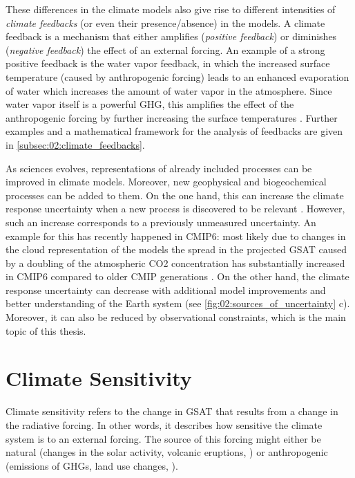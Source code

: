 These differences in the climate models also give rise to different intensities
of \emph{climate feedbacks} (or even their presence/absence) in the models. A
climate feedback is a mechanism that either amplifies (\emph{positive
  feedback}) or diminishes (\emph{negative feedback}) the effect of an external
forcing. An example of a strong positive feedback is the water vapor feedback,
in which the increased surface temperature (caused by anthropogenic forcing)
leads to an enhanced evaporation of water which increases the amount of water
vapor in the atmosphere. Since water vapor itself is a powerful \ac{GHG}, this
amplifies the effect of the anthropogenic forcing by further increasing the
surface temperatures \autocite{Cubasch2013}. Further examples and a
mathematical framework for the analysis of feedbacks are given in
\cref{subsec:02:climate_feedbacks}.

As sciences evolves, representations of already included processes can be
improved in climate models. Moreover, new geophysical and biogeochemical
processes can be added to them. On the one hand, this can increase the climate
response uncertainty when a new process is discovered to be relevant
. However, such an
increase corresponds to a previously unmeasured uncertainty. An example for
this has recently happened in \acs{CMIP}6: most likely due to changes in the
cloud representation of the models the spread in the projected \ac{GSAT} caused
by a doubling of the atmospheric \ac{CO2} concentration has substantially
increased in \acs{CMIP}6 compared to older \ac{CMIP} generations
\autocite{Zelinka2020}. On the other hand, the climate response uncertainty can
decrease with additional model improvements and better understanding of the
Earth system (see \cref{fig:02:sources_of_uncertainty}{\color{BrownRed} c}).
Moreover, it can also be reduced by observational constraints, which is the
main topic of this thesis.


\section{Climate Sensitivity}
\label{sec:02:climate_sensitivity}

Climate sensitivity refers to the change in \ac{GSAT} that results from a
change in the radiative forcing. In other words, it describes how sensitive the
climate system is to an external forcing. The source of this forcing might
either be natural (changes in the solar activity, volcanic eruptions, \etc{})
or anthropogenic (emissions of \acp{GHG}, land use changes, \etc{}).


